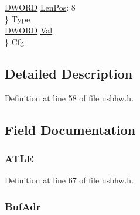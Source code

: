 \begin{DoxyCompactItemize}
\begin{tabbing}
\>\>\hyperlink{type_8h_ad342ac907eb044443153a22f964bf0af}{DWORD} \hyperlink{struct___u_s_b___d_m_a___d_e_s_c_r_i_p_t_o_r_a96cf4769c94aabe17db9bf199e5dddd1}{LenPos}: 8\\
\>\} \hyperlink{struct___u_s_b___d_m_a___d_e_s_c_r_i_p_t_o_r_a05d670c70cee2df071e2593f20a5397c}{Type}\\
\>\hyperlink{type_8h_ad342ac907eb044443153a22f964bf0af}{DWORD} \hyperlink{struct___u_s_b___d_m_a___d_e_s_c_r_i_p_t_o_r_a1a2aefd22f32fe19c7a40fd62958b591}{Val}\\
\} \hyperlink{struct___u_s_b___d_m_a___d_e_s_c_r_i_p_t_o_r_a86e1a345ecd66bb8f2c014dba75301fe}{Cfg}\\

\end{tabbing}\end{DoxyCompactItemize}


\subsection{Detailed Description}


Definition at line 58 of file usbhw.h.



\subsection{Field Documentation}
\hypertarget{struct___u_s_b___d_m_a___d_e_s_c_r_i_p_t_o_r_ac2bacb61775d42b4f06bdf9432d30c9d}{
\subsubsection[{ATLE}]{ {\bf ATLE}}}
\label{struct___u_s_b___d_m_a___d_e_s_c_r_i_p_t_o_r_ac2bacb61775d42b4f06bdf9432d30c9d}


Definition at line 67 of file usbhw.h.

\hypertarget{struct___u_s_b___d_m_a___d_e_s_c_r_i_p_t_o_r_a057b0f9ba2a9d4251d7e5a41db249f31}{
\subsubsection[{BufAdr}]{ {\bf BufAdr}}}
\label{struct___u_s_b___d_m_a___d_e_s_c_r_i_p_t_o_r_a057b0f9ba2a9d4251d7e5a41db249f31}


